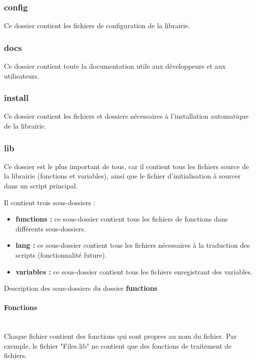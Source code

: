 \documentclass[a4paper,10pt]{article}
\begin{document}
\subsubsection{config}\color{white}
Ce dossier contient les fichiers de configuration de la librairie.

\color{blue}
\subsubsection{docs}\color{white}
Ce dossier contient toute la documentation utile aux développeurs et aux utilisateurs.

\color{blue}
\subsubsection{install}\color{white}
Ce dossier contient les fichiers et dossiers nécessaires à l'installation automatique de la librairie.

\color{blue}
\subsubsection{lib}\color{white}
Ce dossier est le plus important de tous, car il contient tous les fichiers source de la librairie (fonctions et variables), ainsi que le fichier d'initialisation à sourcer dans un script principal.

Il contient trois sous-dossiers :
\begin{itemize}
    \item \color{lime}\textbf{functions\color{white} :} \color{white} ce sous-dossier contient tous les fichiers de fonctions dans différents sous-dossiers.
    \item \color{lime}\textbf{lang\color{white} :} \color{white} ce sous-dossier contient tous les fichiers nécessaires à la traduction des scripts (fonctionnalité future).
    \item \color{lime}\textbf{variables\color{white} :} \color{white} ce sous-dossier contient tous les fichiers enregistrant des variables.
\end{itemize}

Description des sous-dossiers du dossier \textbf{functions}
\setcounter{secnumdepth}{4}
\paragraph{Fonctions}\mbox{}\\
Chaque fichier contient des fonctions qui sont propres au nom du fichier. Par exemple, le fichier "Files.lib" ne contient que des fonctions de traitement de fichiers.
\end{document}
